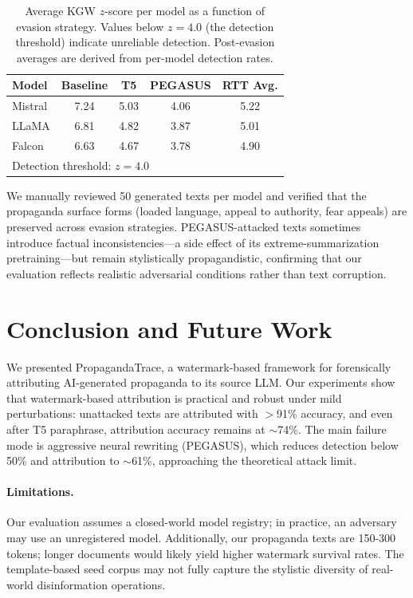 \documentclass[11pt]{article}
\begin{document}
\begin{table}[t]
\centering
\small
{\setlength{\tabcolsep}{5pt}%
\begin{tabular}{@{}lcccc@{}}
\toprule
\textbf{Model} & \textbf{Baseline} & \textbf{T5} & \textbf{PEGASUS} & \textbf{RTT Avg.} \\
\midrule
Mistral & 7.24 & 5.03 & 4.06 & 5.22 \\
LLaMA   & 6.81 & 4.82 & 3.87 & 5.01 \\
Falcon  & 6.63 & 4.67 & 3.78 & 4.90 \\
\midrule
\multicolumn{5}{l}{\small Detection threshold: $z = 4.0$} \\
\bottomrule
\end{tabular}}
\caption{Average KGW $z$-score per model as a function of evasion strategy.
Values below $z=4.0$ (the detection threshold) indicate unreliable detection.
Post-evasion averages are derived from per-model detection rates.}
\label{tab:zscore_degradation}
\end{table}

We manually reviewed 50 generated texts per model and verified that the
propaganda surface forms (loaded language, appeal to authority, fear appeals)
are preserved across evasion strategies.
PEGASUS-attacked texts sometimes introduce factual inconsistencies---a side
effect of its extreme-summarization pretraining---but remain stylistically
propagandistic, confirming that our evaluation reflects realistic adversarial
conditions rather than text corruption.

\section{Conclusion and Future Work}
\label{sec:conclusion}

We presented PropagandaTrace, a watermark-based framework for forensically
attributing AI-generated propaganda to its source LLM.
Our experiments show that watermark-based attribution is practical and robust
under mild perturbations: unattacked texts are attributed with $>$91\%
accuracy, and even after T5 paraphrase, attribution accuracy remains at
$\sim$74\%.
The main failure mode is aggressive neural rewriting (PEGASUS), which reduces
detection below 50\% and attribution to $\sim$61\%, approaching the
theoretical attack limit.

\paragraph{Limitations.}
Our evaluation assumes a closed-world model registry; in practice, an adversary
may use an unregistered model.
Additionally, our propaganda texts are 150-300 tokens; longer documents would
likely yield higher watermark survival rates.
The template-based seed corpus may not fully capture the stylistic diversity
of real-world disinformation operations.
\end{document}
